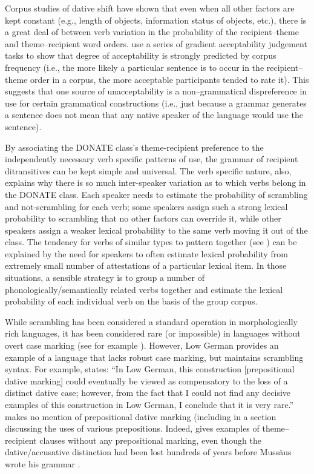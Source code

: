 Corpus studies of dative shift \citep{Collins.1995,Bresnan.2007,Bresnan.2009} have shown that even when all other factors are kept constant (e.g., length of objects, information status of objects, etc.), there is a great deal of between verb variation in the probability of the recipient--theme and theme--recipient word orders. \cite{Bresnan.2010} use a series of gradient acceptability judgement tasks to show that degree of acceptability is strongly predicted by corpus frequency (i.e., the more likely a particular sentence is to occur in the recipient--theme order in a corpus, the more acceptable participants tended to rate it). This suggests that one source of unacceptability is a non--grammatical dispreference in use for certain grammatical constructions (i.e., just because a grammar generates a sentence does not mean that any native speaker of the language would use the sentence). 

By associating the DONATE class's theme-recipient preference to the independently necessary verb specific patterns of use, the grammar of recipient ditransitives can be kept simple and universal. The verb specific nature, also, explains why there is so much inter-speaker variation as to which verbs belong in the DONATE class. Each speaker needs to estimate the probability of scrambling and not-scrambling for each verb; some speakers assign such a strong lexical probability to scrambling that no other factors can override it, while other speakers assign a weaker lexical probability to the same verb moving it out of the class. The tendency for verbs of similar types to pattern together (see \citealt{Levin.1993}) can be explained by the need for speakers to often estimate lexical probability from extremely small number of attestations of a particular lexical item. In those situations, a sensible strategy is to group a number of phonologically/semantically related verbs together and estimate the lexical probability of each individual verb on the basis of the group corpus.

While scrambling has been considered a standard operation in morphologically rich languages, it has been considered rare (or impossible) in languages without overt case marking (see for example \citet{Weerman.1997}). However, Low German provides an example of a language that lacks robust case marking, but maintains scrambling syntax. For example, \cite{Fleischer.2006} states: ``In Low German, this construction [prepositional dative marking] could eventually be viewed as compensatory to the loss of a distinct dative case; however, from the fact that I could not find any decisive examples of this construction in Low German, I conclude that it is very rare.'' \cite{Lindow.1998} makes no mention of prepositional dative marking (including in a section discussing the uses of various prepositions. Indeed, \cite{Mussaus.1829} gives examples of theme--recipient clauses without any prepositional marking, even though the dative/accusative distinction had been lost hundreds of years before Mussäus wrote his grammar \citep{Lasch.1914,Boden.1993}.

